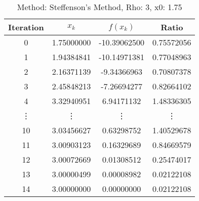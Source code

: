 \begin{table}
\centering
\caption{Method: Steffenson's Method, Rho: 3, x0: 1.75}
\label{tab:table_Steffenson's_Method_3_1_75}
\begin{tabular}{c c c c}
\toprule
Iteration &      $x_k$ &     $f(x_k)$ &      Ratio \\
\midrule
        0 & 1.75000000 & -10.39062500 & 0.75572056 \\
        1 & 1.94384841 & -10.14971381 & 0.77048963 \\
        2 & 2.16371139 &  -9.34366963 & 0.70807378 \\
        3 & 2.45848213 &  -7.26694277 & 0.82664102 \\
        4 & 3.32940951 &   6.94171132 & 1.48336305 \\
   \vdots &     \vdots &       \vdots &     \vdots \\
       10 & 3.03456627 &   0.63298752 & 1.40529678 \\
       11 & 3.00903123 &   0.16329689 & 0.84669579 \\
       12 & 3.00072669 &   0.01308512 & 0.25474017 \\
       13 & 3.00000499 &   0.00008982 & 0.02122108 \\
       14 & 3.00000000 &   0.00000000 & 0.02122108 \\
\bottomrule
\end{tabular}
\end{table}
